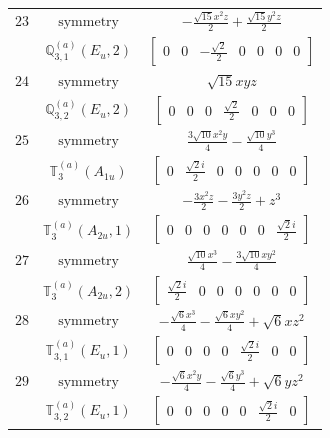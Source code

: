 \documentclass[fleqn,8pt,landscape]{jsarticle}
\begin{document}
\begin{longtable}{ccc}
$ 23 $ & $ \text{symmetry} $ & $ - \frac{\sqrt{15} x^{2} z}{2} + \frac{\sqrt{15} y^{2} z}{2} $ \\
$  $ & $ \mathbb{Q}_{3,1}^{(a)}(E_{u},2) $ & $ \begin{bmatrix} 0 & 0 & - \frac{\sqrt{2}}{2} & 0 & 0 & 0 & 0 \end{bmatrix} $ \\ \hline
$ 24 $ & $ \text{symmetry} $ & $ \sqrt{15} x y z $ \\
$  $ & $ \mathbb{Q}_{3,2}^{(a)}(E_{u},2) $ & $ \begin{bmatrix} 0 & 0 & 0 & \frac{\sqrt{2}}{2} & 0 & 0 & 0 \end{bmatrix} $ \\ \hline
$ 25 $ & $ \text{symmetry} $ & $ \frac{3 \sqrt{10} x^{2} y}{4} - \frac{\sqrt{10} y^{3}}{4} $ \\
$  $ & $ \mathbb{T}_{3}^{(a)}(A_{1u}) $ & $ \begin{bmatrix} 0 & \frac{\sqrt{2} i}{2} & 0 & 0 & 0 & 0 & 0 \end{bmatrix} $ \\ \hline
$ 26 $ & $ \text{symmetry} $ & $ - \frac{3 x^{2} z}{2} - \frac{3 y^{2} z}{2} + z^{3} $ \\
$  $ & $ \mathbb{T}_{3}^{(a)}(A_{2u},1) $ & $ \begin{bmatrix} 0 & 0 & 0 & 0 & 0 & 0 & \frac{\sqrt{2} i}{2} \end{bmatrix} $ \\ \hline
$ 27 $ & $ \text{symmetry} $ & $ \frac{\sqrt{10} x^{3}}{4} - \frac{3 \sqrt{10} x y^{2}}{4} $ \\
$  $ & $ \mathbb{T}_{3}^{(a)}(A_{2u},2) $ & $ \begin{bmatrix} \frac{\sqrt{2} i}{2} & 0 & 0 & 0 & 0 & 0 & 0 \end{bmatrix} $ \\ \hline
$ 28 $ & $ \text{symmetry} $ & $ - \frac{\sqrt{6} x^{3}}{4} - \frac{\sqrt{6} x y^{2}}{4} + \sqrt{6} x z^{2} $ \\
$  $ & $ \mathbb{T}_{3,1}^{(a)}(E_{u},1) $ & $ \begin{bmatrix} 0 & 0 & 0 & 0 & \frac{\sqrt{2} i}{2} & 0 & 0 \end{bmatrix} $ \\ \hline
$ 29 $ & $ \text{symmetry} $ & $ - \frac{\sqrt{6} x^{2} y}{4} - \frac{\sqrt{6} y^{3}}{4} + \sqrt{6} y z^{2} $ \\
$  $ & $ \mathbb{T}_{3,2}^{(a)}(E_{u},1) $ & $ \begin{bmatrix} 0 & 0 & 0 & 0 & 0 & \frac{\sqrt{2} i}{2} & 0 \end{bmatrix} $ \\ \hline

\end{longtable}
\end{document}
